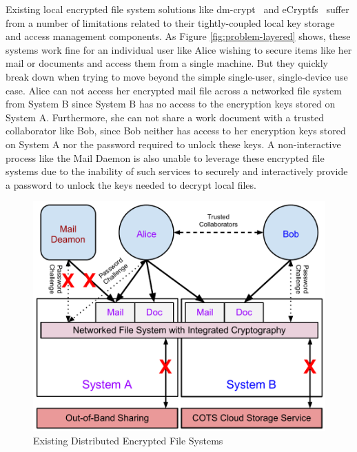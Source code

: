 Existing local encrypted file system solutions like
dm-crypt~\cite{dm-crypt} and eCryptfs~\cite{Halcrow} suffer from a
number of limitations related to their tightly-coupled local key
storage and access management components. As Figure
\ref{fig:problem-layered} shows, these systems work fine for an
individual user like Alice wishing to secure items like her mail or
documents and access them from a single machine. But they quickly
break down when trying to move beyond the simple single-user,
single-device use case. Alice can not access her encrypted mail file
across a networked file system from System B since System B has no
access to the encryption keys stored on System A. Furthermore, she can
not share a work document with a trusted collaborator like Bob, since
Bob neither has access to her encryption keys stored on System A nor
the password required to unlock these keys. A non-interactive process
like the Mail Daemon is also unable to leverage these encrypted file
systems due to the inability of such services to securely and
interactively provide a password to unlock the keys needed to decrypt
local files.

\begin{figure}[!tb]
  \centering
  \includegraphics[width=\columnwidth]{./include/Problem-Integrated.pdf}
  \caption{Existing Distributed Encrypted File Systems}
  \label{fig:problem-integrated}
\end{figure}


